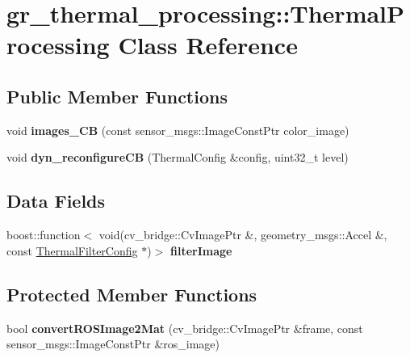 \hypertarget{classgr__thermal__processing_1_1ThermalProcessing}{}\section{gr\+\_\+thermal\+\_\+processing\+:\+:Thermal\+Processing Class Reference}
\label{classgr__thermal__processing_1_1ThermalProcessing}
\subsection*{Public Member Functions}
\begin{DoxyCompactItemize}
\item 
\mbox{\label{classgr__thermal__processing_1_1ThermalProcessing_ac2802db2e8adfcece03931307e7880c4}} 
void {\bfseries images\+\_\+\+CB} (const sensor\+\_\+msgs\+::\+Image\+Const\+Ptr color\+\_\+image)
\item 
\mbox{\label{classgr__thermal__processing_1_1ThermalProcessing_a4fea5904fa8d124cb6538757a48b1643}} 
void {\bfseries dyn\+\_\+reconfigure\+CB} (Thermal\+Config \&config, uint32\+\_\+t level)
\end{DoxyCompactItemize}
\subsection*{Data Fields}
\begin{DoxyCompactItemize}
\item 
\mbox{\label{classgr__thermal__processing_1_1ThermalProcessing_a5c1bd86d12568b4bab203e60b526cdac}} 
boost\+::function$<$ void(cv\+\_\+bridge\+::\+Cv\+Image\+Ptr \&, geometry\+\_\+msgs\+::\+Accel \&, const \hyperlink{structgr__thermal__processing_1_1ThermalFilterConfig}{Thermal\+Filter\+Config} $\ast$)$>$ {\bfseries filter\+Image}
\end{DoxyCompactItemize}
\subsection*{Protected Member Functions}
\begin{DoxyCompactItemize}
\item 
\mbox{\label{classgr__thermal__processing_1_1ThermalProcessing_a4475a7e12d4d4a435a2d83d6718475f1}} 
bool {\bfseries convert\+R\+O\+S\+Image2\+Mat} (cv\+\_\+bridge\+::\+Cv\+Image\+Ptr \&frame, const sensor\+\_\+msgs\+::\+Image\+Const\+Ptr \&ros\+\_\+image)
\end{DoxyCompactItemize}


